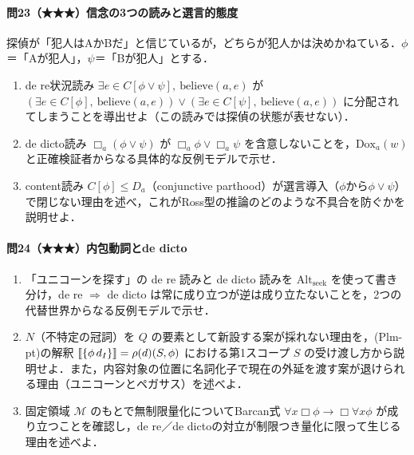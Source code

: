 \documentclass[../../main-detail.tex]{subfiles}
\begin{document}
\paragraph{問23（★★★）信念の3つの読みと選言的態度}
探偵が「犯人はAかBだ」と信じているが，どちらが犯人かは決めかねている．$\phi$＝「Aが犯人」，$\psi$＝「Bが犯人」とする．
\begin{enumerate}[label=(\alph*)]
    \item de re状況読み $\exists e \in C[\phi \lor \psi],\ \mathrm{believe}(a, e)$ が
    $(\exists e \in C[\phi],\ \mathrm{believe}(a,e)) \lor (\exists e \in C[\psi],\ \mathrm{believe}(a,e))$
    に分配されてしまうことを導出せよ（この読みでは探偵の状態が表せない）．
    \item de dicto読み $\Box_a(\phi \lor \psi)$ が $\Box_a\phi \lor \Box_a\psi$ を含意しないことを，$\mathrm{Dox}_a(w)$ と正確検証者からなる具体的な反例モデルで示せ．
    \item content読み $C[\phi] \le D_a$（conjunctive parthood）が選言導入（$\phi$から$\phi\lor\psi$）で閉じない理由を述べ，これがRoss型の推論のどのような不具合を防ぐかを説明せよ．
\end{enumerate}

\paragraph{問24（★★★）内包動詞とde dicto}
\begin{enumerate}[label=(\alph*)]
    \item 「ユニコーンを探す」の de re 読みと de dicto 読みを $\mathrm{Alt}_{\mathrm{seek}}$ を使って書き分け，de re $\Rightarrow$ de dicto は常に成り立つが逆は成り立たないことを，2つの代替世界からなる反例モデルで示せ．
    \item $N$（不特定の冠詞）を $Q$ の要素として新設する案が採れない理由を，(Plm-pt)の解釈 $\llbracket\{\phi\, d_I\}\rrbracket = \rho(d)(S, \phi)$ における第1スコープ $S$ の受け渡し方から説明せよ．また，内容対象の位置に名詞化子で現在の外延を渡す案が退けられる理由（ユニコーンとペガサス）を述べよ．
    \item 固定領域 $\mathcal{M}$ のもとで無制限量化についてBarcan式 $\forall x \Box\phi \to \Box\forall x\phi$ が成り立つことを確認し，de re／de dictoの対立が制限つき量化に限って生じる理由を述べよ．
\end{enumerate}
\end{document}
